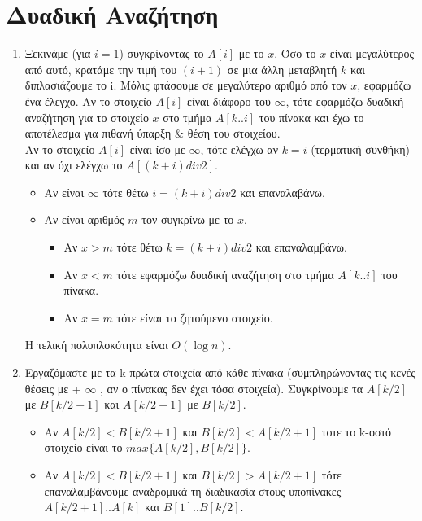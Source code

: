 \documentclass[a4paper,10pt]{article} \usepackage{anysize}
\begin{document}
\section{Δυαδική Αναζήτηση}
\begin{enumerate}
\item Ξεκινάμε (για $i=1$) συγκρίνοντας το $A[i]$ με το $x$. Όσο το $x$ είναι
μεγαλύτερος από αυτό, κρατάμε την τιμή του $(i+1)$ σε μια άλλη μεταβλητή $k$ και
διπλασιάζουμε το i.
Μόλις φτάσουμε σε μεγαλύτερο αριθμό από τον $x$, εφαρμόζω ένα έλεγχο.
Αν το στοιχείο $A[i]$ είναι διάφορο του $\infty$, τότε εφαρμόζω δυαδική αναζήτηση
για το στοιχείο $x$ στο τμήμα $Α[k..i]$ του πίνακα και έχω το αποτέλεσμα για
πιθανή ύπαρξη \& θέση του στοιχείου. \\
Αν το στοιχείο $A[i]$ είναι ίσο με $\infty$, τότε ελέγχω αν $k=i$ (τερματική
συνθήκη) και αν όχι ελέγχω το $A[(k+i) div 2]$.
\begin{itemize}
\item Αν είναι $\infty$ τότε θέτω $i= (k+i)div 2$ και επαναλαβάνω.
\item Αν είναι αριθμός $m$ τον συγκρίνω με το $x$.
\begin{itemize}
\item Αν $x>m$ τότε θέτω $k= (k+i) div 2$ και επαναλαμβάνω.
\item Αν $x<m$ τότε εφαρμόζω δυαδική αναζήτηση στο τμήμα $A[k..i]$ του
πίνακα.
\item Αν $x=m$ τότε είναι το ζητούμενο στοιχείο.
\end{itemize}
\end{itemize}

Η τελική πολυπλοκότητα είναι $O(\log{n})$.\\

\item Εργαζόμαστε με τα k πρώτα στοιχεία από κάθε πίνακα (συμπληρώνοντας τις
κενές θέσεις με + $\infty$ , αν ο πίνακας δεν έχει τόσα στοιχεία). Συγκρίνουμε τα
$A[k/2]$ με $B[k/2+1]$ και $A[k/2+1]$ με $B[k/2]$.
\begin{itemize}
\item Αν $A[k/2]<B[k/2+1]$ και $B[k/2]<A[k/2+1]$ τοτε το k-οστό στοιχείο είναι το
$max\{A[k/2],B[k/2]\}$.
\item Αν $A[k/2]<B[k/2+1]$ και $B[k/2]>A[k/2+1]$ τότε επαναλαμβάνουμε αναδρομικά
τη διαδικασία στους υποπίνακες $A[k/2+1]..A[k]$ και $B[1]..B[k/2]$.
\end{itemize}
\end{enumerate}

\end{document}
